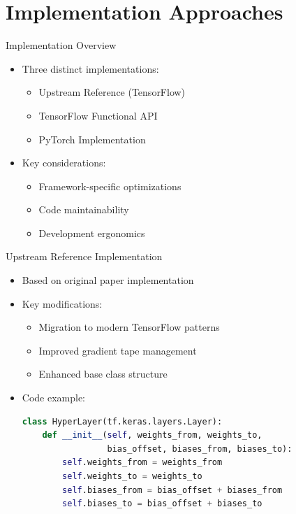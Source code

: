 \documentclass{beamer}
\begin{document}
\section{Implementation Approaches}
\begin{frame}{Implementation Overview}
    \begin{itemize}
        \item Three distinct implementations:
        \begin{itemize}
            \item Upstream Reference (TensorFlow)
            \item TensorFlow Functional API
            \item PyTorch Implementation
        \end{itemize}
        \item Key considerations:
        \begin{itemize}
            \item Framework-specific optimizations
            \item Code maintainability
            \item Development ergonomics
        \end{itemize}
    \end{itemize}
\end{frame}

\begin{frame}{Upstream Reference Implementation}
    \begin{itemize}
        \item Based on original paper implementation
        \item Key modifications:
        \begin{itemize}
            \item Migration to modern TensorFlow patterns
            \item Improved gradient tape management
            \item Enhanced base class structure
        \end{itemize}
        \item Code example:
        \begin{lstlisting}[language=Python]
class HyperLayer(tf.keras.layers.Layer):
    def __init__(self, weights_from, weights_to,
                 bias_offset, biases_from, biases_to):
        self.weights_from = weights_from
        self.weights_to = weights_to
        self.biases_from = bias_offset + biases_from
        self.biases_to = bias_offset + biases_to
        \end{lstlisting}
    \end{itemize}
\end{frame}
\end{document}
